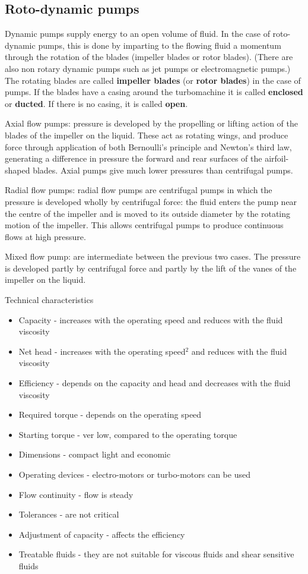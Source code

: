 \subsection{Roto-dynamic pumps}
Dynamic pumps supply energy to an open volume of fluid. In the case of roto-dynamic pumps, this is done by imparting to the flowing fluid a momentum through the rotation of the blades (impeller blades or rotor blades). (There are also non rotary dynamic pumps such as jet pumps or electromagnetic pumps.) The rotating blades are called \textbf{impeller blades} (or \textbf{rotor blades}) in the case of pumps. If the blades have a casing around the turbomachine it is called \textbf{enclosed} or \textbf{ducted}. If there is no casing, it is called \textbf{open}.

Axial flow pumps: pressure is developed by the propelling or lifting action of the blades of the impeller on the liquid. These act as rotating wings, and produce force through application of both Bernoulli's principle and Newton's third law, generating a difference in pressure the forward and rear surfaces of the airfoil-shaped blades. Axial pumps give much lower pressures than centrifugal pumps.

Radial flow pumps: radial flow pumps are centrifugal pumps in which the pressure is developed wholly by centrifugal force: the fluid enters the pump near the centre of the impeller and is moved to its outside diameter by the rotating motion of the impeller. This allows centrifugal pumps to produce continuous flows at high pressure.

Mixed flow pump: are intermediate between the previous two cases. The pressure is developed partly by centrifugal force and partly by the lift of the vanes of the impeller on the liquid.

Technical characteristics
\begin{itemize}
  \item Capacity - increases with the operating speed and reduces with the fluid viscosity
  \item Net head - increases with the operating speed$^2$ and reduces with the fluid viscosity
  \item Efficiency - depends on the capacity and head and decreases with the fluid viscosity
  \item Required torque - depends on the operating speed
  \item Starting torque - ver low, compared to the operating torque
  \item Dimensions - compact light and economic
  \item Operating devices - electro-motors or turbo-motors can be used
  \item Flow continuity - flow is steady
  \item Tolerances - are not critical
  \item Adjustment of capacity - affects the efficiency
  \item Treatable fluids - they are not suitable for viscous fluids and shear sensitive fluids
\end{itemize}
